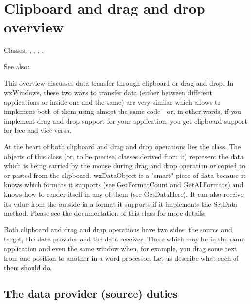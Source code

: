 
\section{Clipboard and drag and drop overview}\label{wxdndoverview}

Classes: ,
 ,
 ,
 ,

See also: 

This overview discusses data transfer through clipboard or drag and drop. In
wxWindows, these two ways to transfer data (either between different
applications or inside one and the same) are very similar which allows to
implement both of them using almost the same code - or, in other
words, if you implement drag and drop support for your application, you get
clipboard support for free and vice versa.

At the heart of both clipboard and drag and drop operations lies the 
 class. The objects of this class (or, to
be precise, classes derived from it) represent the data which is being carried
by the mouse during drag and drop operation or copied to or pasted from the
clipboard. wxDataObject is a "smart" piece of data because it knows which
formats it supports (see GetFormatCount and GetAllFormats) and knows how to
render itself in any of them (see GetDataHere). It can also receive its value
from the outside in a format it supports if it implements the SetData method.
Please see the documentation of this class for more details.

Both clipboard and drag and drop operations have two sides: the source and
target, the data provider and the data receiver. These which may be in the same
application and even the same window when, for example, you drag some text from
one position to another in a word processor. Let us describe what each of them
should do.

\subsection{The data provider (source) duties}\label{wxdataobjectsource}

